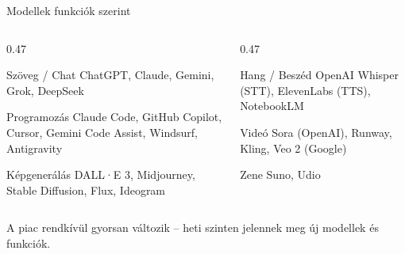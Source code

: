 \documentclass[aspectratio=169, 12pt]{beamer}
\begin{document}
\begin{frame}{Modellek funkciók szerint}
  \begin{columns}[T,onlytextwidth]
    \begin{column}{0.47\textwidth}
      \begin{block}{Szöveg / Chat}
        \smallskip\footnotesize ChatGPT, Claude, Gemini, Grok, DeepSeek
      \end{block}
      \begin{block}{Programozás}
        \smallskip\footnotesize Claude Code, GitHub Copilot, Cursor, Gemini Code Assist, Windsurf, Antigravity
      \end{block}
      \begin{block}{Képgenerálás}
        \smallskip\footnotesize DALL·E 3, Midjourney, Stable Diffusion, Flux, Ideogram
      \end{block}
    \end{column}
    \begin{column}{0.47\textwidth}
      \begin{block}{Hang / Beszéd}
        \smallskip\footnotesize OpenAI Whisper (STT), ElevenLabs (TTS), NotebookLM
      \end{block}
      \begin{block}{Videó}
        \smallskip\footnotesize Sora (OpenAI), Runway, Kling, Veo 2 (Google)
      \end{block}
      \begin{block}{Zene}
        \smallskip\footnotesize Suno, Udio
      \end{block}
    \end{column}
  \end{columns}

  \vspace{0.3cm}
  \centering
  {\footnotesize\color{gray} A piac rendkívül gyorsan változik -- heti szinten jelennek meg új modellek és funkciók.}
\end{frame}
\end{document}
